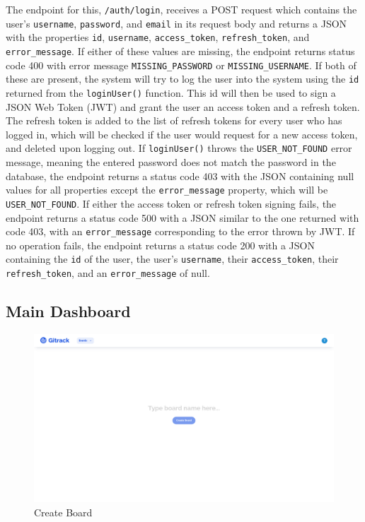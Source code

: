 \documentclass{article}
\def\code#1{\texttt{#1}}
\begin{document}
The endpoint for this, \code{/auth/login}, receives a POST request which
contains the user’s \code{username}, \code{password}, and \code{email} in its
request body and returns a JSON with the properties \code{id}, \code{username},
\code{access\_token}, \code{refresh\_token}, and \code{error\_message}. If
either of these values are missing, the endpoint returns status code 400 with
error message \code{MISSING\_PASSWORD} or \code{MISSING\_USERNAME}. If both of
these are present, the system will try to log the user into the system using the
\code{id} returned from the \code{loginUser()} function. This id will then be
used to sign a JSON Web Token (JWT) and grant the user an access token and a
refresh token. The refresh token is added to the list of refresh tokens for
every user who has logged in, which will be checked if the user would request
for a new access token, and deleted upon logging out. If \code{loginUser()}
throws the \code{USER\_NOT\_FOUND} error message, meaning the entered password
does not match the password in the database, the endpoint returns a status code
403 with the JSON containing null values for all properties except the
\code{error\_message} property, which will be \code{USER\_NOT\_FOUND}. If either
the access token or refresh token signing fails, the endpoint returns a status
code 500 with a JSON similar to the one returned with code 403, with an
\code{error\_message} corresponding to the error thrown by JWT. If no operation
fails, the endpoint returns a status code 200 with a JSON containing the
\code{id} of the user, the user’s \code{username}, their \code{access\_token},
their \code{refresh\_token}, and an \code{error\_message} of null.


\subsection{Main Dashboard}
\begin{figure}[H]
	\includegraphics[width=1\textwidth]{create-board}\par\vspace{0.5cm}
	\caption{Create Board}
	\label{fig:create-board}
\end{figure}
\end{document}
